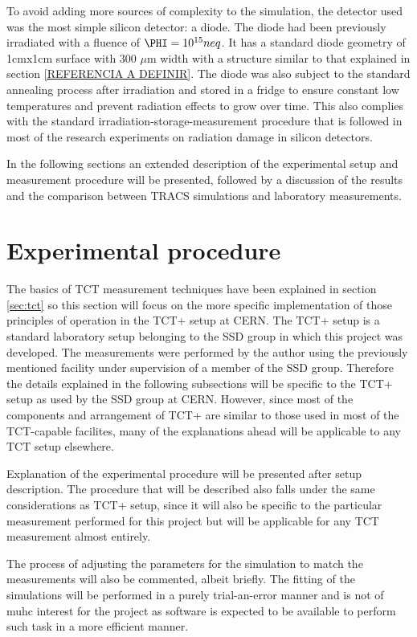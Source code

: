 To avoid adding more sources of complexity to the simulation, the detector used was the most simple silicon detector: a diode. The diode had been previously irradiated with a fluence of $\PHI = 10^{15} neq$. It has a standard diode geometry of 1cmx1cm surface with 300 $\mu$m width with a structure similar to that explained in section \ref{REFERENCIA A DEFINIR}. The diode was also subject to the standard annealing process after irradiation and stored in a fridge to ensure constant low temperatures and prevent radiation effects to grow over time. This also complies with the standard irradiation-storage-measurement procedure that is followed in most of the research experiments on radiation damage in silicon detectors.

In the following sections an extended description of the experimental setup and  measurement procedure will be presented, followed by a discussion of the results and the comparison between TRACS simulations and laboratory measurements.

\section{Experimental procedure} %
\label{sec:future_improvements}

The basics of TCT measurement techniques have been explained in section \ref{sec:tct} so this section will focus on the more specific implementation of those principles of operation in the TCT+ setup at CERN. The TCT+ setup is a standard laboratory setup belonging to the SSD group in which this project was developed. The measurements were performed by the author using the previously mentioned facility under supervision of a member of the SSD group. Therefore the details explained in the following subsections will be specific to the TCT+ setup as used by the SSD group at CERN. However, since most of the components and arrangement of TCT+ are similar to those used in most of the TCT-capable facilites, many of the explanations ahead will be applicable to any TCT setup elsewhere. 

Explanation of the experimental procedure will be presented after setup description. The procedure that will be described also falls under the same considerations as TCT+ setup, since it will also be specific to the particular measurement performed for this project but will be applicable for any TCT measurement almost entirely. 

The process of adjusting the parameters for the simulation to match the measurements will also be commented, albeit briefly. The fitting of the simulations will be performed in a purely trial-an-error manner and is not of muhc interest for the project as software is expected to be available to perform such task in a more efficient manner. 

